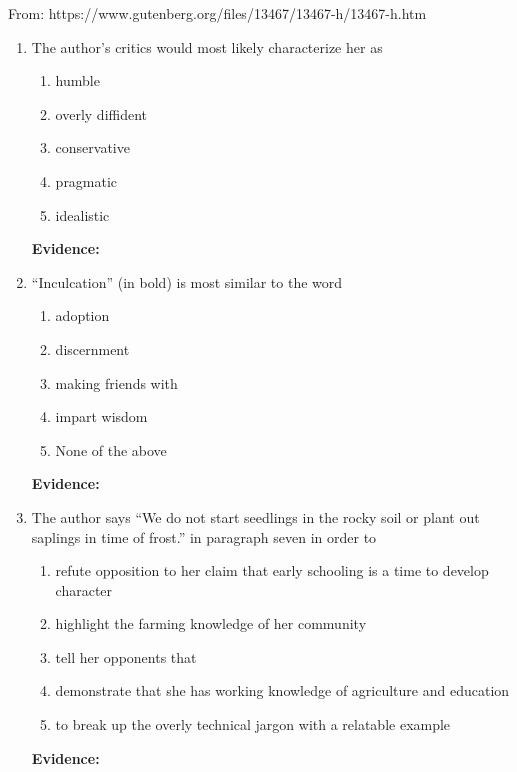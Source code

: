 From: https://www.gutenberg.org/files/13467/13467-h/13467-h.htm

\bigskip
\begin{enumerate}

\item 

\bigskip The author's critics would most likely characterize her as 
\begin{enumerate}[label=(\Alph*)]
\item humble
\item overly diffident
\item conservative
\item pragmatic
\item idealistic
\end{enumerate}

\bigskip
\textbf{Evidence:} \hrulefill

\bigskip
\item ``Inculcation'' (in bold) is most similar to the word

\bigskip
\begin{enumerate}[label=(\Alph*)]
\item adoption 
\item discernment 
\item making friends with
\item impart wisdom
\item None of the above
\end{enumerate}

\bigskip
\textbf{Evidence:} \hrulefill

\bigskip
\item The author says ``We do not start seedlings in the rocky soil or plant out saplings in time of frost.'' in paragraph seven in order to

\bigskip
\begin{enumerate}[label=(\Alph*)]
\item refute opposition to her claim that early schooling is a time to develop character
\item highlight the farming knowledge of her community
\item tell her opponents that 
\item demonstrate that she has working knowledge of agriculture and education
\item to break up the overly technical jargon with a relatable example
\end{enumerate}

\bigskip
\textbf{Evidence:} \hrulefill



\end{enumerate}
